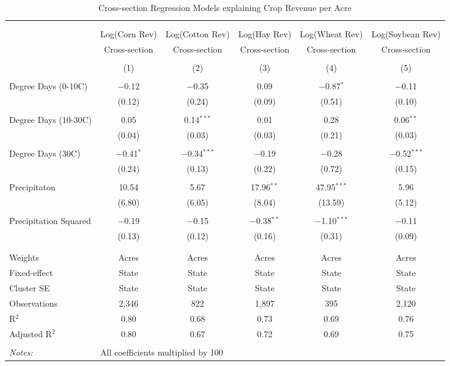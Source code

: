 \documentclass[10pt]{article}
\begin{document}
\begin{table}[!htbp] \centering 
  \caption{Cross-section Regression Models explaining Crop Revenue per Acre} 
  \label{} 
\footnotesize 
\begin{tabular}{@{\extracolsep{5pt}}lccccc} 
\\[-1.8ex]\hline 
\hline \\[-1.8ex] 
\\[-1.8ex] & Log(Corn Rev) & Log(Cotton Rev) & Log(Hay Rev) & Log(Wheat Rev) & Log(Soybean Rev) \\ 
 & Cross-section & Cross-section & Cross-section & Cross-section & Cross-section \\ 
\\[-1.8ex] & (1) & (2) & (3) & (4) & (5)\\ 
\hline \\[-1.8ex] 
 Degree Days (0-10C) & $-$0.12 & $-$0.35 & 0.09 & $-$0.87$^{*}$ & $-$0.11 \\ 
  & (0.12) & (0.24) & (0.09) & (0.51) & (0.10) \\ 
  & & & & & \\ 
 Degree Days (10-30C) & 0.05 & 0.14$^{***}$ & 0.01 & 0.28 & 0.06$^{**}$ \\ 
  & (0.04) & (0.03) & (0.03) & (0.21) & (0.03) \\ 
  & & & & & \\ 
 Degree Days (30C) & $-$0.41$^{*}$ & $-$0.34$^{***}$ & $-$0.19 & $-$0.28 & $-$0.52$^{***}$ \\ 
  & (0.24) & (0.13) & (0.22) & (0.72) & (0.15) \\ 
  & & & & & \\ 
 Precipitaton & 10.54 & 5.67 & 17.96$^{**}$ & 47.95$^{***}$ & 5.96 \\ 
  & (6.80) & (6.05) & (8.04) & (13.59) & (5.12) \\ 
  & & & & & \\ 
 Precipitation Squared & $-$0.19 & $-$0.15 & $-$0.38$^{**}$ & $-$1.10$^{***}$ & $-$0.11 \\ 
  & (0.13) & (0.12) & (0.16) & (0.31) & (0.09) \\ 
  & & & & & \\ 
\hline \\[-1.8ex] 
Weights & Acres & Acres & Acres & Acres & Acres \\ 
Fixed-effect & State & State & State & State & State \\ 
Cluster SE & State & State & State & State & State \\ 
Observations & 2,346 & 822 & 1,897 & 395 & 2,120 \\ 
R$^{2}$ & 0.80 & 0.68 & 0.73 & 0.69 & 0.76 \\ 
Adjusted R$^{2}$ & 0.80 & 0.67 & 0.72 & 0.69 & 0.75 \\ 
\hline 
\hline \\[-1.8ex] 
\textit{Notes:} & \multicolumn{5}{l}{All coefficients multiplied by 100} \\ 
\end{tabular} 
\end{table} 
\end{document}
